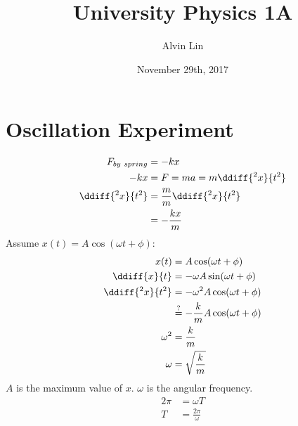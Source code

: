 \documentclass{math}
\title{University Physics 1A}
\author{Alvin Lin}
\date{November 29th, 2017}
\begin{document}
\maketitle

\section*{Oscillation Experiment}
\begin{align*}
  F_{by~spring} &= -kx \\
  -kx &= F = ma = m\ddiff{^2x}{t^2} \\
  \ddiff{^2x}{t^2} &= \frac{m}{m}\ddiff{^2x}{t^2} \\
  &= -\frac{kx}{m} \\
\end{align*}
Assume \( x(t) = A\cos(\omega t+\phi) \):
\begin{align*}
  x(t) &= A\cos(\omega t+\phi) \\
  \ddiff{x}{t} &= -\omega A\sin(\omega t+\phi) \\
  \ddiff{^2x}{t^2} &= -\omega^2A\cos(\omega t+\phi) \\
  &\stackrel{?}{=} -\frac{k}{m}A\cos(\omega t+\phi) \\
  \omega^2 &= \frac{k}{m} \\
  \omega &= \sqrt{\frac{k}{m}}
\end{align*}
\( A \) is the maximum value of \( x \). \( \omega \) is the angular frequency.
\begin{align*}
  2\pi &= \omega T \\
  T &= \frac{2\pi}{\omega}
\end{align*}
\end{document}
